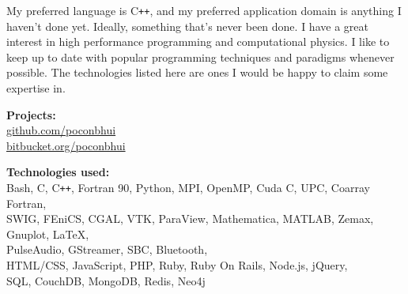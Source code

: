 \documentclass[11pt]{article}
\newcommand{\resumeSection}[1]{
    \par
    \large {\sc {#1}}
    \par
    \vspace{-0.9\baselineskip}
    \hrulefill
    \vspace{0.5\baselineskip}
    \par
}
\newenvironment{resumeSubSectionBody}{
    \par
    \vspace{-0.8\parskip}
    \begin{small}
    \par
} {
    \par
    \end{small}
    \par
}
\begin{document}
%
%
\begin{resumeSubSectionBody}

    My preferred language is C\verb!++!, and my preferred application domain is
    anything I haven't done yet.
    Ideally, something that's never been done.
    I have a great interest in high performance programming and computational
    physics.
    I like to keep up to date with popular programming techniques and paradigms
    whenever possible.
    The technologies listed here are ones I would be happy to claim some
    expertise in.

    \begin{description}
        \item{\bf Projects:} \\
            \href{https://github.com/poconbhui}{github.com/poconbhui} \\
            \href{https://bitbucket.org/poconbhui}{bitbucket.org/poconbhui}

        \item{\bf Technologies used:} \\
            Bash, C, C\verb!++!, Fortran 90, Python,
            MPI, OpenMP, Cuda C, UPC, Coarray Fortran,
            \\
            SWIG, FEniCS, CGAL, VTK, ParaView,
            Mathematica, MATLAB, Zemax, Gnuplot, LaTeX,
            \\
            PulseAudio, GStreamer, SBC, Bluetooth,
            \\
            HTML/CSS, JavaScript, PHP, Ruby,
            Ruby On Rails, Node.js, jQuery,
            \\
            SQL, CouchDB, MongoDB, Redis, Neo4j
    \end{description}

\end{resumeSubSectionBody}




\resumeSection{Education \& Training}
\end{document}
